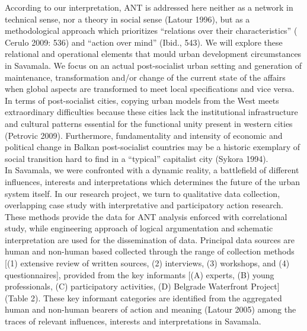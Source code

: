 \documentclass[11pt]{report}
\begin{document}
According to our interpretation, ANT is addressed here neither as a network in technical sense, nor a theory in social sense (Latour 1996), but as a methodological approach which prioritizes  “relations over their characteristics” ( Cerulo 2009: 536) and “action over mind” (Ibid., 543). We will explore these relational and operational elements that mould urban development circumstances in Savamala. We focus on an actual post-socialist urban setting and generation of maintenance, transformation and/or change of the current state of the affairs when global aspects are transformed to meet local specifications and vice versa. In terms of post-socialist cities, copying urban models from the West meets extraordinary difficulties because these cities lack the institutional infrastructure and cultural patterns essential for the functional unity present in western cities (Petrovic 2009). Furthermore, fundamentality and intensity of economic and political change in Balkan post-socialist countries may be a historic exemplary of social transition hard to find in a “typical” capitalist city (Sykora 1994).
\\
In Savamala, we were confronted with a dynamic reality, a battlefield of different influences, interests and interpretations which determines the future of the urban system itself. In our research project, we turn to qualitative data collection, overlapping case study with interpretative and participatory action research. These methods provide the data for ANT analysis enforced with correlational study, while engineering approach of logical argumentation and schematic interpretation are used for the dissemination of data. Principal data sources are human and non-human based  collected through the range of collection methods [(1) extensive review of written sources, (2) interviews, (3) workshops, and (4) questionnaires], provided from the key informants [(A) experts, (B) young professionals, (C) participatory activities, (D) Belgrade Waterfront Project] (Table 2). These key informant categories are identified from the aggregated human and non-human bearers of action and meaning (Latour 2005) among the traces of relevant influences, interests and interpretations in Savamala.
\\
\end{document}
